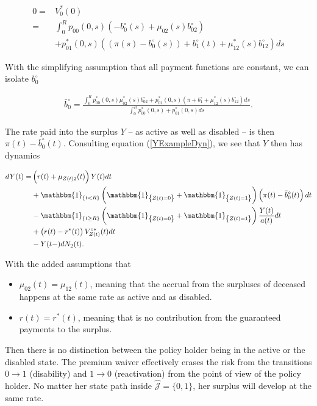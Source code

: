 \documentclass{book}
\newcommand{\1}[1]{\mathbbm{1}_{\left\lbrace #1 \right\rbrace}}
\theoremstyle{break}
\theoremstyle{remark}
\numberwithin{equation}{section}
\begin{document}
\begin{align*}
	0 =& V_0^*(0) \\
	=& \int_0^R p_{00}(0,s) \left( - b_0^\circ(s)  + \mu_{02}(s) b_{02}^\circ \right) \\
	&+ p_{01}^*(0,s) \left( \left( \pi(s) - b_0^\circ(s) \right) + b_1^\circ(t) + \mu_{12}^*(s) b_{12}^\circ \right) ds
\end{align*}

With the simplifying assumption that all payment functions are constant, we can isolate $b_0^\circ$

\begin{align*}
	\bar{b}_0^\circ = \frac{\int_0^R p_{00}^*(0,s) \mu_{02}^*(s) b_{02}^\circ + p_{01}^*(0,s) \left( \pi + b_1^\circ + \mu_{12}^*(s) b_{12}^\circ \right) ds}{\int_0^R p_{00}^*(0,s) + p_{01}^*(0,s)ds}.
\end{align*}

The rate paid into the surplus $Y$ -- as active as well as disabled -- is then $\pi(t) - \bar{b}_0^\circ(t)$. Consulting equation (\ref{YExampleDyn}), we see that $Y$ then has dynamics

\begin{align*}
\begin{split}
	dY(t) =& \left( r(t) + \mu_{Z(t)2}(t) \right) Y(t) dt \\
	&+ \1{t<R} \left( \1{Z(t)=0} + \1{Z(t)=1} \right) \left(\pi(t) - \bar{b}_0^\circ(t) \right) dt \\
	&- \1{t \geq R} \left( \1{Z(t)=0} + \1{Z(t)=1} \right) \frac{Y(t)}{a(t)} dt \\
	&+ \left( r(t) - r^*(t) \right) V_{Z(t)}^{\circ*}(t) dt \\
	&- Y(t-) dN_2(t).
\end{split}
\end{align*}

With the added assumptions that

\begin{itemize}
	\item $\mu_{02}(t) = \mu_{12}(t)$, meaning that the accrual from the surpluses of deceased happens at the same rate as active and as disabled.
	\item $r(t) = r^*(t)$, meaning that is no contribution from the guaranteed payments to the surplus.
\end{itemize}

Then there is no distinction between the policy holder being in the active or the disabled state. The premium waiver effectively erases the risk from the transitions $0 \to 1$ (disability) and $1 \to 0$ (reactivation) from the point of view of the policy holder. No matter her state path inside $\hat{\mathcal{J}} = \{ 0,1 \}$, her surplus will develop at the same rate.
\end{document}
